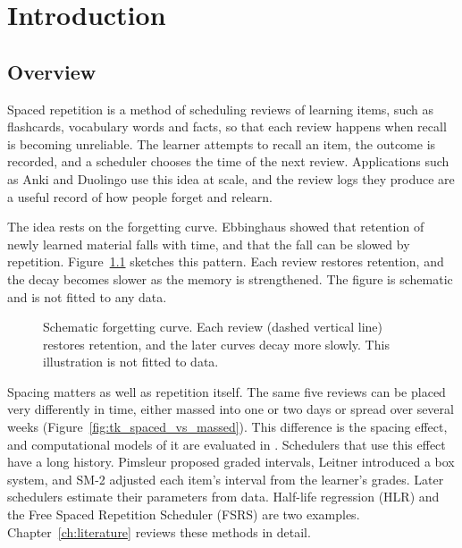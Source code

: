 \chapter{Introduction}
\label{ch:introduction}

\section{Overview}
\label{sec:intro-background}

Spaced repetition is a method of scheduling reviews of learning items, such as flashcards,
vocabulary words and facts, so that each review happens when recall is becoming unreliable.
The learner attempts to recall an item, the outcome is recorded, and a scheduler chooses the
time of the next review. Applications such as Anki and Duolingo use this idea at scale, and the
review logs they produce are a useful record of how people forget and relearn.

The idea rests on the forgetting curve. Ebbinghaus \cite{ebbinghaus1885memory} showed that
retention of newly learned material falls with time, and that the fall can be slowed by
repetition. Figure~\ref{fig:tk_forgetting_curve} sketches this pattern. Each review
restores retention, and the decay becomes slower as the memory is strengthened. The figure is
schematic and is not fitted to any data.

\begin{figure}[htbp]
  \centering
  
  \caption{Schematic forgetting curve. Each review (dashed vertical line) restores retention,
    and the later curves decay more slowly. This illustration is not fitted to data.}
  \label{fig:tk_forgetting_curve}
\end{figure}

Spacing matters as well as repetition itself. The same five reviews can be placed very differently in
time, either massed into one or two days or spread over several weeks
(Figure~\ref{fig:tk_spaced_vs_massed}). This difference is the spacing effect, and computational
models of it are evaluated in \cite{walsh2018ppe}. Schedulers that use this effect have a long history. Pimsleur
\cite{pimsleur1967} proposed graded intervals, Leitner \cite{leitner1972lernen} introduced a box
system, and SM-2 \cite{wozniak1990sm2} adjusted each item's interval from the learner's grades.
Later schedulers estimate their parameters from data. Half-life regression (HLR)
\cite{settles2016trainable} and the Free Spaced Repetition Scheduler (FSRS) \cite{ye2022stochastic}
are two examples. Chapter~\ref{ch:literature} reviews these methods in detail.

